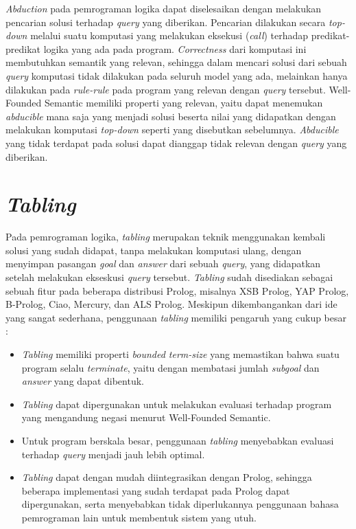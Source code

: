 \textit{Abduction} pada pemrograman logika dapat diselesaikan dengan melakukan pencarian solusi terhadap \textit{query} yang diberikan. Pencarian dilakukan secara \textit{top-down} melalui suatu komputasi yang melakukan eksekusi (\textit{call}) terhadap predikat-predikat logika yang ada pada program. \textit{Correctness} dari komputasi ini membutuhkan semantik yang relevan, sehingga dalam mencari solusi dari sebuah \textit{query} komputasi tidak dilakukan pada seluruh model yang ada, melainkan hanya dilakukan pada \textit{rule-rule} pada program yang relevan dengan \textit{query} tersebut. Well-Founded Semantic memiliki properti yang relevan, yaitu dapat menemukan \textit{abducible} mana saja yang menjadi solusi  beserta nilai yang didapatkan dengan melakukan komputasi \textit{top-down} seperti yang disebutkan sebelumnya. \textit{Abducible} yang tidak terdapat pada solusi dapat dianggap tidak relevan dengan \textit{query} yang diberikan.

\section{\textit{Tabling}}

Pada pemrograman logika, \textit{tabling} merupakan teknik menggunakan kembali solusi yang sudah didapat, tanpa melakukan komputasi ulang, dengan menyimpan pasangan \textit{goal} dan \textit{answer} dari sebuah \textit{query}, yang didapatkan setelah melakukan ekseskusi \textit{query} tersebut. \textit{Tabling} sudah disediakan sebagai sebuah fitur pada beberapa distribusi Prolog, misalnya XSB Prolog, YAP Prolog, B-Prolog, Ciao, Mercury, dan ALS Prolog. Meskipun dikembangankan dari ide yang sangat sederhana, penggunaan \textit{tabling} memiliki pengaruh yang cukup besar \citep{swift2012xsb}:

\begin{itemize}
	\item \textit{Tabling} memiliki properti \textit{bounded term-size} yang memastikan bahwa suatu program selalu \textit{terminate}, yaitu dengan membatasi jumlah \textit{subgoal} dan \textit{answer} yang dapat dibentuk.
	\item \textit{Tabling} dapat dipergunakan untuk melakukan evaluasi terhadap program yang mengandung negasi menurut Well-Founded Semantic.
	\item Untuk program berskala besar, penggunaan \textit{tabling} menyebabkan evaluasi terhadap \textit{query} menjadi jauh lebih optimal.
	\item \textit{Tabling} dapat dengan mudah diintegrasikan dengan Prolog, sehingga beberapa implementasi yang sudah terdapat pada Prolog dapat dipergunakan, serta menyebabkan tidak diperlukannya penggunaan bahasa pemrograman lain untuk membentuk sistem yang utuh.
\end{itemize}

